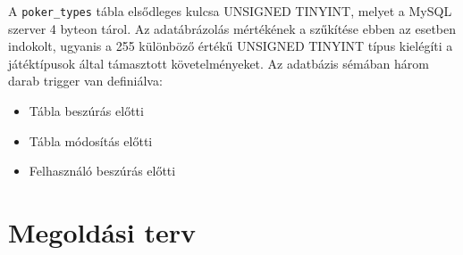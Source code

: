 \hfill \break

A \texttt{poker\_types} tábla elsődleges kulcsa UNSIGNED TINYINT, melyet a MySQL szerver 4 byteon tárol. Az adatábrázolás mértékének a szűkítése ebben az esetben indokolt, ugyanis a 255 különböző értékű UNSIGNED TINYINT típus kielégíti a játéktípusok által támasztott követelményeket. Az adatbázis sémában három darab trigger van definiálva:
\begin{itemize}
\item Tábla beszúrás előtti
\item Tábla módosítás előtti
\item Felhasználó beszúrás előtti
\end{itemize}



\section{Megoldási terv}
